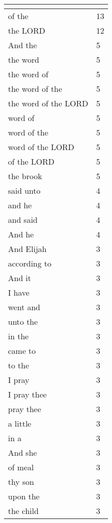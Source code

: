 \begin{center}
\begin{longtable}{|p{3.0in}|p{0.5in}|}
\hline \multicolumn{2}{c}{{ }} \\ \hline
\endfoot 
of the & 13\\ \hline 
the LORD & 12\\ \hline 
And the & 5\\ \hline 
the word & 5\\ \hline 
the word of & 5\\ \hline 
the word of the & 5\\ \hline 
the word of the LORD & 5\\ \hline 
word of & 5\\ \hline 
word of the & 5\\ \hline 
word of the LORD & 5\\ \hline 
of the LORD & 5\\ \hline 
the brook & 5\\ \hline 
said unto & 4\\ \hline 
and he & 4\\ \hline 
and said & 4\\ \hline 
And he & 4\\ \hline 
And Elijah & 3\\ \hline 
according to & 3\\ \hline 
And it & 3\\ \hline 
I have & 3\\ \hline 
went and & 3\\ \hline 
unto the & 3\\ \hline 
in the & 3\\ \hline 
came to & 3\\ \hline 
to the & 3\\ \hline 
I pray & 3\\ \hline 
I pray thee & 3\\ \hline 
pray thee & 3\\ \hline 
a little & 3\\ \hline 
in a & 3\\ \hline 
And she & 3\\ \hline 
of meal & 3\\ \hline 
thy son & 3\\ \hline 
upon the & 3\\ \hline 
the child & 3\\ \hline 
\end{longtable}
\end{center}





